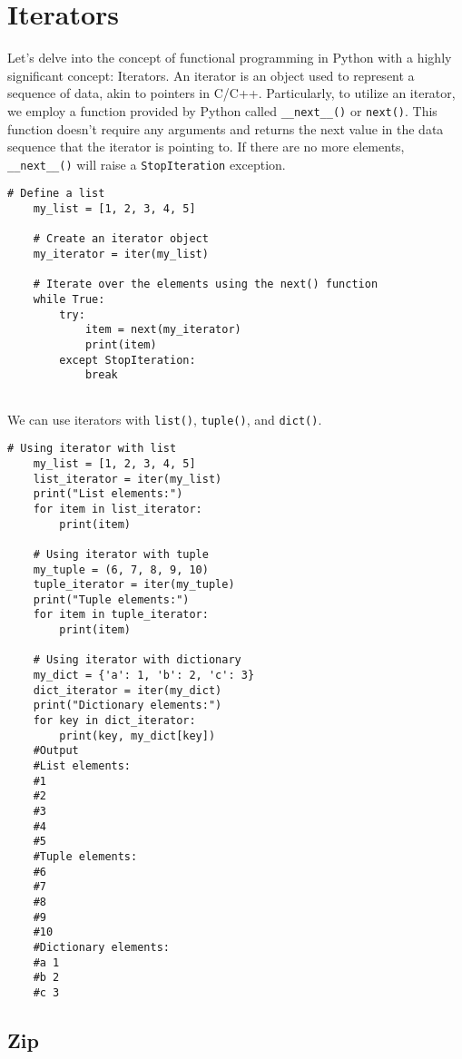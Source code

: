 \section{Iterators}
Let's delve into the concept of functional programming in Python with a highly significant concept: Iterators.
 An iterator is an object used to represent a sequence of data, akin 
 to pointers in C/C++. Particularly, to utilize an iterator, 
 we employ a function provided by Python called \verb|__next__()|
or \verb|next()|. This function doesn't require any arguments and returns
 the next value in the data sequence that the iterator is pointing to.
  If there are no more elements, \verb|__next__()| will raise a \verb|StopIteration| exception.
  
\begin{lstlisting}[style=mystyle]
    # Define a list
    my_list = [1, 2, 3, 4, 5]
    
    # Create an iterator object
    my_iterator = iter(my_list)
    
    # Iterate over the elements using the next() function
    while True:
        try:
            item = next(my_iterator)
            print(item)
        except StopIteration:
            break
    
\end{lstlisting}


We can use iterators with \verb|list()|, \verb|tuple()|, and \verb|dict()|.
\begin{lstlisting}[style=mystyle]
    # Using iterator with list
    my_list = [1, 2, 3, 4, 5]
    list_iterator = iter(my_list)
    print("List elements:")
    for item in list_iterator:
        print(item)
    
    # Using iterator with tuple
    my_tuple = (6, 7, 8, 9, 10)
    tuple_iterator = iter(my_tuple)
    print("Tuple elements:")
    for item in tuple_iterator:
        print(item)
    
    # Using iterator with dictionary
    my_dict = {'a': 1, 'b': 2, 'c': 3}
    dict_iterator = iter(my_dict)
    print("Dictionary elements:")
    for key in dict_iterator:
        print(key, my_dict[key])
    #Output
    #List elements:
    #1
    #2
    #3
    #4
    #5
    #Tuple elements:
    #6
    #7
    #8
    #9
    #10
    #Dictionary elements:
    #a 1
    #b 2
    #c 3
\end{lstlisting}
\subsection{Zip}

